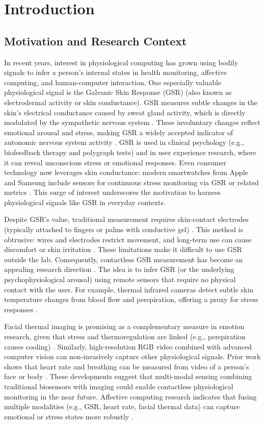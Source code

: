 \chapter{Introduction}


\section{Motivation and Research Context}
In recent years, interest in physiological computing has grown \textemdash using bodily signals to infer a person's internal states in health monitoring, affective computing, and human-computer interaction. One especially valuable physiological signal is the Galvanic Skin Response (GSR) (also known as electrodermal activity or skin conductance). GSR measures subtle changes in the skin's electrical conductance caused by sweat gland activity, which is directly modulated by the sympathetic nervous system \cite{ref1}. These involuntary changes reflect emotional arousal and stress, making GSR a widely accepted indicator of autonomic nervous system activity \cite{ref1}. GSR is used in clinical psychology (e.g., biofeedback therapy and polygraph tests) and in user experience research, where it can reveal unconscious stress or emotional responses. Even consumer technology now leverages skin conductance: modern smartwatches from Apple and Samsung include sensors for continuous stress monitoring via GSR or related metrics \cite{ref2}. This surge of interest underscores the motivation to harness physiological signals like GSR in everyday contexts.

Despite GSR's value, traditional measurement requires skin-contact electrodes (typically attached to fingers or palms with conductive gel) \cite{ref3}. This method is obtrusive: wires and electrodes restrict movement, and long-term use can cause discomfort or skin irritation \cite{ref3}. These limitations make it difficult to use GSR outside the lab. Consequently, contactless GSR measurement has become an appealing research direction \cite{ref4}. The idea is to infer GSR (or the underlying psychophysiological arousal) using remote sensors that require no physical contact with the user. For example, thermal infrared cameras detect subtle skin temperature changes from blood flow and perspiration, offering a proxy for stress responses \cite{ref5}.

Facial thermal imaging is promising as a complementary measure in emotion research, given that stress and thermoregulation are linked (e.g., perspiration causes cooling) \cite{ref5}. Similarly, high-resolution RGB video combined with advanced computer vision can non-invasively capture other physiological signals. Prior work shows that heart rate and breathing can be measured from video of a person's face or body \cite{ref6}. These developments suggest that multi-modal sensing \textemdash combining traditional biosensors with imaging \textemdash could enable contactless physiological monitoring in the near future. Affective computing research indicates that fusing multiple modalities (e.g., GSR, heart rate, facial thermal data) can capture emotional or stress states more robustly \cite{ref1}.

